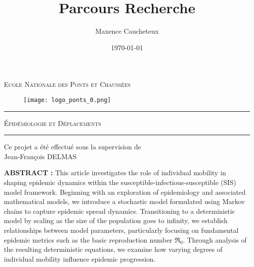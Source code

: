 \documentclass[a4paper,10.9pt]{article}
\title{Parcours Recherche}
\author{Maxence Caucheteux}
\date{\today}
\newcommand{\R}{\mathfrak{R}_0}
\begin{document}
\maketitle

\vspace{1em}
\vspace{1em}
\vspace{1em}

\begin{center}
    \textsc{\LARGE Ecole Nationale des Ponts et Chaussées}
\end{center}

\vspace{1em}

\begin{figure}[h]
    \centering
    \texttt{[image: logo\_ponts\_0.png]}
\end{figure}

\setlength{\arrayrulewidth}{2pt}

\vspace{1em}

\rule{\textwidth}{2pt}

\vspace{1em}

\begin{center}
    \textsc{\LARGE Épidémiologie et Déplacements}
\end{center}

\rule{\textwidth}{2pt}


\vspace{4em}
\begin{center}
	{\Large Ce projet a été effectué sous la supervision de }\\
	\vspace{0.3cm}
	{\huge Jean-François DELMAS}
\end{center}

\newpage

\tableofcontents

\newpage

\textbf{ABSTRACT :} This article investigates the role of individual mobility in shaping epidemic dynamics within the susceptible-infectious-susceptible (SIS) model framework. Beginning with an exploration of epidemiology and associated mathematical models, we introduce a stochastic model formulated using Markov chains to capture epidemic spread dynamics. Transitioning to a deterministic model by scaling as the size of the population goes to infinity, we establish relationships between model parameters, particularly focusing on fundamental epidemic metrics such as the basic reproduction number $\R$. Through analysis of the resulting deterministic equations, we examine how varying degrees of individual mobility influence epidemic progression.
\end{document}
